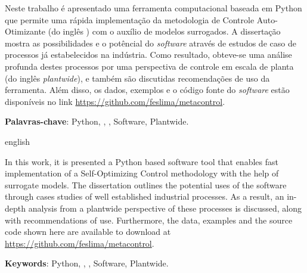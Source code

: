 \documentclass[pretext-section.tex]{subfiles}
\begin{document}
\setlength{\absparsep}{18pt} %
\begin{resumo}[Resumo]
 
  Neste trabalho é apresentado uma ferramenta computacional baseada em Python 
  que permite uma rápida implementação da metodologia de Controle 
  Auto-Otimizante (do inglês \soc) com o auxílio de modelos surrogados. A 
  dissertação mostra as possibilidades e o potêncial do \textit{software} 
  \mtc através de estudos de caso de processos já estabelecidos na indústria. 
  Como resultado, obteve-se uma análise profunda destes processos por uma 
  perspectiva de controle em escala de planta (do inglês \textit{plantwide}), 
  e também são discutidas recomendações de uso da ferramenta. Além disso, os 
  dados, exemplos e o código fonte do \textit{software} \mtc estão disponíveis 
  no link \url{https://github.com/feslima/metacontrol}.

 \textbf{Palavras-chave}: Python, \soc, \kriging, Software, Plantwide.
\end{resumo}

\begin{resumo}[Abstract]
 \begin{otherlanguage*}{english}

  In this work, it is presented a Python based software tool that enables 
  fast implementation of a Self-Optimizing Control methodology with the 
  help of surrogate models. The dissertation outlines the potential uses of the 
  \mtc software through cases studies of well established 
  industrial processes. As a result, an in-depth analysis from a plantwide
  perspective of these processes is discussed, along with recommendations
  of use. Furthermore, the data, examples and the 
  \mtc source code shown here are available to download at
  \url{https://github.com/feslima/metacontrol}.

   \vspace{\onelineskip}
 
   \noindent 
   \textbf{Keywords}: Python, \soc, \kriging, Software, Plantwide.
 \end{otherlanguage*}
\end{resumo}
\end{document}
